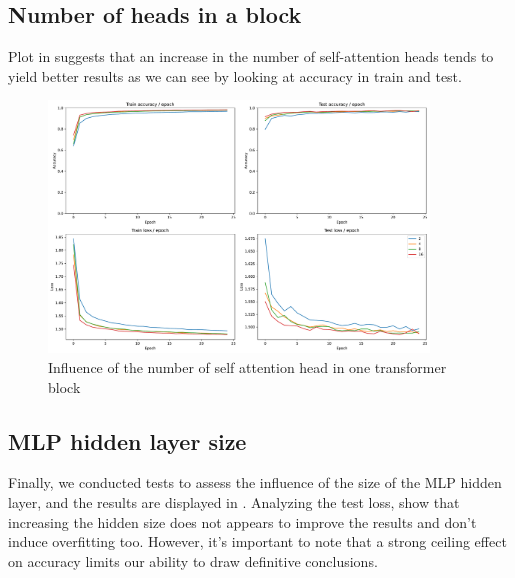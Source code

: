 \subsection{Number of heads in a block}
Plot in  suggests that an increase in the number of self-attention heads tends to yield better results as we can see by looking at accuracy in train and test.

\begin{figure}[H]
    \centering
    \includegraphics*[width=0.9\textwidth]{figs/Transformers/num_heads_influence_25.pdf}
    \caption{Influence of the number of self attention head in one transformer block }
    \label{fig:num_heads_influence}
\end{figure}

\subsection{MLP hidden layer size}
Finally, we conducted tests to assess the influence of the size of the MLP hidden layer, and the results are displayed in . Analyzing the test loss, show that increasing the hidden size does not appears to improve the results and don't induce overfitting too. However, it's important to note that a strong ceiling effect on accuracy limits our ability to draw definitive conclusions.

